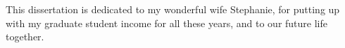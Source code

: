 This dissertation is dedicated to my wonderful wife Stephanie, for putting up with my graduate student income for all these years, and to our future life together.